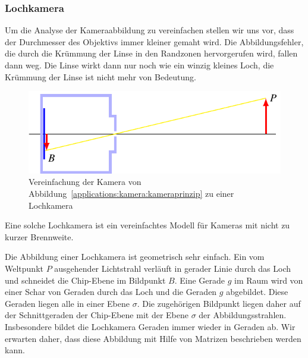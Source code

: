 \subsubsection{Lochkamera}
Um die Analyse der Kameraabbildung zu vereinfachen stellen wir uns vor,
dass der Durchmesser des Objektivs immer kleiner gemaht wird.
Die Abbildungsfehler, die durch die Krümmung der Linse in den Randzonen
hervorgerufen wird, fallen dann weg.
Die Linse wirkt dann nur noch wie ein winzig kleines Loch, die Krümmung
der Linse ist nicht mehr von Bedeutung.
\begin{figure}
\centering
\includegraphics{applications/kamera/lochkamera.pdf}
\caption{Vereinfachung der Kamera von
Abbildung~\ref{applications:kamera:kameraprinzip} zu einer Lochkamera
\label{applications:kamera:lochkamera}}
\end{figure}
Eine solche Lochkamera ist ein vereinfachtes Modell für Kameras mit
nicht zu kurzer Brennweite.

Die Abbildung einer Lochkamera ist geometrisch sehr einfach.
Ein vom Weltpunkt $P$ ausgehender Lichtstrahl verläuft in gerader
Linie durch das Loch und schneidet die Chip-Ebene im Bildpunkt $B$.
Eine Gerade $g$ im Raum wird von einer Schar von Geraden durch das Loch und
die Geraden $g$ abgebildet.
Diese Geraden liegen alle in einer Ebene $\sigma$.
Die zugehörigen Bildpunkt liegen daher auf der Schnittgeraden der
Chip-Ebene mit der Ebene $\sigma$ der Abbildungsstrahlen.
Insbesondere bildet die Lochkamera Geraden immer wieder in Geraden ab.
Wir erwarten daher, dass diese Abbildung mit Hilfe von Matrizen
beschrieben werden kann.
